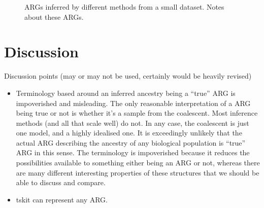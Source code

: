 \documentclass{article}
\begin{document}
\begin{figure}
\vspace{5em}
\caption{\label{fig-inferred-args}
ARGs inferred by different methods from a small dataset. Notes about these
ARGs.
}
\end{figure}

\section*{Discussion}

Discussion points (may or may not be used, certainly would be heavily revised)

\begin{itemize}
\item Terminology based around an inferred ancestry being a ``true''
ARG is impoverished and misleading. The only reasonable interpretation
of a ARG being true or not is whether it's a sample from the coalescent.
Most inference methods (and all that scale well) do not. In any case,
the coalescent is just one model, and a highly idealised one. It is
exceedingly unlikely that the actual ARG describing the ancestry
of any biological population is ``true'' ARG in this sense. The terminology is
impoverished because it reduces the possibilities available
to something either being an ARG or not, whereas there are many different
interesting properties of these structures that we should be able to
discuss and compare.
\item tskit can represent any ARG.
\end{itemize}



\end{document}
